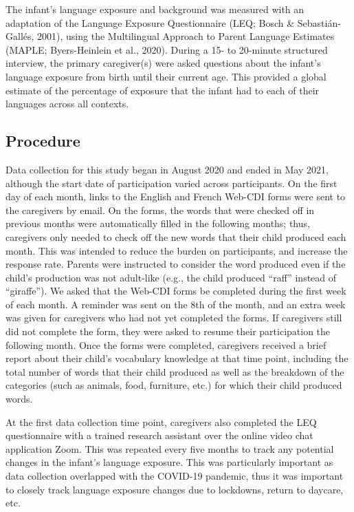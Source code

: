 \documentclass[
  ,man,floatsintext]{apa6}
\begin{document}
The infant's language exposure and background was measured with an adaptation of the Language Exposure Questionnaire (LEQ; Bosch \& Sebastián-Gallés, 2001), using the Multilingual Approach to Parent Language Estimates (MAPLE; Byers-Heinlein et al., 2020). During a 15- to 20-minute structured interview, the primary caregiver(s) were asked questions about the infant's language exposure from birth until their current age. This provided a global estimate of the percentage of exposure that the infant had to each of their languages across all contexts.

\hypertarget{procedure}{%
\subsection{Procedure}\label{procedure}}

Data collection for this study began in August 2020 and ended in May 2021, although the start date of participation varied across participants. On the first day of each month, links to the English and French Web-CDI forms were sent to the caregivers by email. On the forms, the words that were checked off in previous months were automatically filled in the following months; thus, caregivers only needed to check off the new words that their child produced each month. This was intended to reduce the burden on participants, and increase the response rate. Parents were instructed to consider the word produced even if the child's production was not adult-like (e.g., the child produced ``raff'' instead of ``giraffe''). We asked that the Web-CDI forms be completed during the first week of each month. A reminder was sent on the 8th of the month, and an extra week was given for caregivers who had not yet completed the forms. If caregivers still did not complete the form, they were asked to resume their participation the following month. Once the forms were completed, caregivers received a brief report about their child's vocabulary knowledge at that time point, including the total number of words that their child produced as well as the breakdown of the categories (such as animals, food, furniture, etc.) for which their child produced words.

At the first data collection time point, caregivers also completed the LEQ questionnaire with a trained research assistant over the online video chat application Zoom. This was repeated every five months to track any potential changes in the infant's language exposure. This was particularly important as data collection overlapped with the COVID-19 pandemic, thus it was important to closely track language exposure changes due to lockdowns, return to daycare, etc.
\end{document}
